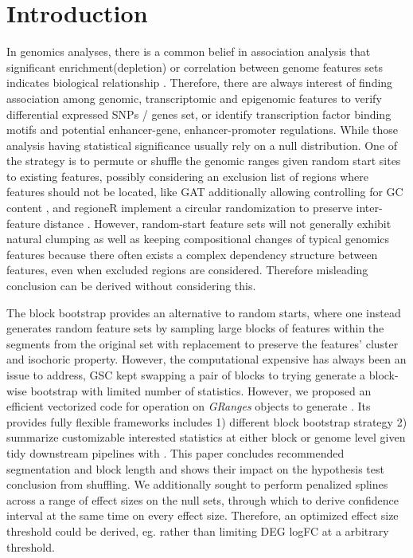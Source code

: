 \section{Introduction}
In genomics analyses, there is a common belief in association
analysis that significant enrichment(depletion) or correlation between
genome features sets indicates biological relationship
\citep{reviewdilemma2014}.  Therefore, there are always interest of
finding association among genomic, transcriptomic and epigenomic
features
to verify differential expressed SNPs / genes set, or identify
transcription factor binding motifs and potential enhancer-gene,
enhancer-promoter regulations.
While those analysis having statistical significance usually rely on a
null distribution.  One of the strategy is to permute or shuffle the
genomic ranges given random start sites to existing features, possibly
considering an exclusion list of regions where features should not be
located, like GAT additionally allowing controlling for GC content
\citep{GAT_2013}, and regioneR implement a circular randomization to
preserve inter-feature distance \citep{gel2016regioner}.  However,
random-start feature sets will not generally exhibit natural clumping
as well as keeping compositional changes of typical genomics features
because there often exists a complex dependency structure between
features,
even when excluded regions are considered.  Therefore misleading
conclusion can be derived without considering this.

The block bootstrap \citep{politis1999subsampling}
provides an alternative to random starts, where one instead generates
random feature sets by sampling large blocks of features within the
segments from the original set with replacement to preserve the
features' cluster and isochoric property. However, the computational
expensive has always been an issue to address, GSC
\citep{bickel2010subsampling} kept swapping a pair of blocks to trying
generate a block-wise bootstrap with limited number of statistics.
However, we proposed an efficient vectorized code for operation on
\emph{GRanges}\xspace \citep{lawrence2013software} objects to generate
\bootranges. Its provides fully flexible frameworks includes 1)
different block bootstrap strategy 2) summarize customizable
interested statistics at either block or genome level given tidy
downstream pipelines with \plyranges \citep{lee2019plyranges}. This
paper concludes recommended segmentation and block length and shows
their impact on the hypothesis test conclusion from shuffling.  We
additionally sought to perform penalized splines across a range of
effect sizes on the null sets, through which to derive confidence
interval at the same time on every effect size. Therefore, an
optimized effect size threshold could be derived, eg. rather than
limiting DEG logFC at a arbitrary threshold.

